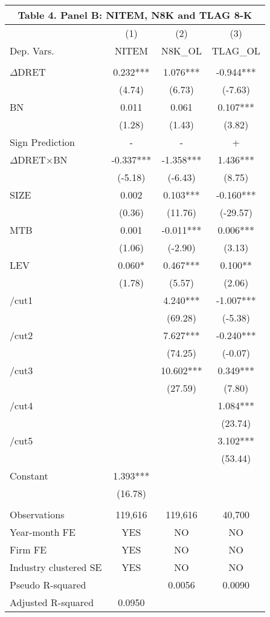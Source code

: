 \begin{table}[htbp] \label{T4PB}
  \centering
    \begin{tabular}{lccc}
    \multicolumn{4}{c}{\textbf{Table 4. Panel B: NITEM, N8K and TLAG 8-K}} \\
    \midrule
    \midrule
      & (1) & (2) & (3) \\
    Dep. Vars. & NITEM & N8K\_OL & TLAG\_OL \\
    \midrule
      &   &   &  \\
    $\Delta$DRET & 0.232*** & 1.076*** & -0.944*** \\
    & (4.74) & (6.73) & (-7.63) \\
    BN & 0.011 & 0.061 & 0.107*** \\
    & (1.28) & (1.43) & (3.82) \\
    \rowcolor[rgb]{ .933,  .925,  .882} Sign Prediction & - & - & + \\
    \rowcolor[rgb]{ .933,  .925,  .882} $\Delta$DRET$\times$BN & -0.337*** & -1.358*** & 1.436*** \\
    \rowcolor[rgb]{ .933,  .925,  .882}   & (-5.18) & (-6.43) & (8.75) \\
    SIZE & 0.002 & 0.103*** & -0.160*** \\
    & (0.36) & (11.76) & (-29.57) \\
    MTB & 0.001 & -0.011*** & 0.006*** \\
    & (1.06) & (-2.90) & (3.13) \\
    LEV & 0.060* & 0.467*** & 0.100** \\
    & (1.78) & (5.57) & (2.06) \\
    /cut1 &   & 4.240*** & -1.007*** \\
    &   & (69.28) & (-5.38) \\
    /cut2 &   & 7.627*** & -0.240*** \\
    &   & (74.25) & (-0.07) \\
    /cut3 &   & 10.602*** & 0.349*** \\
    &   & (27.59) & (7.80) \\
    /cut4 &   &   & 1.084*** \\
    &   &   & (23.74) \\
    /cut5 &   &   & 3.102*** \\
    &   &   & (53.44) \\
    Constant & 1.393*** &   &  \\
    & (16.78) &   &  \\
    &   &   &  \\
    Observations & 119,616 & 119,616 & 40,700 \\
    Year-month FE & YES & NO & NO \\
    Firm FE & YES & NO & NO \\
    Industry clustered SE & YES & NO & NO \\
    Pseudo R-squared & & 0.0056 & 0.0090 \\
    Adjusted R-squared & 0.0950 &   &  \\
    \bottomrule
    \bottomrule
    \end{tabular}%
\end{table}%